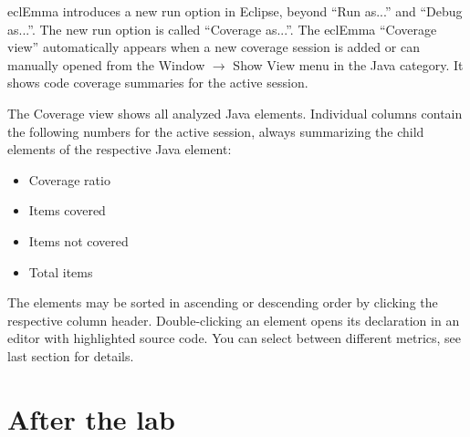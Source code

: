 \documentclass{scrreprt}
\begin{document}
eclEmma introduces a new run option in Eclipse, beyond ``Run as...'' and ``Debug as...''. The new run option is called ``Coverage as...''. The eclEmma ``Coverage view'' automatically appears when a new coverage session is added or can manually opened from the Window $\rightarrow$ Show View menu in the Java category. It shows code coverage summaries for the active session. 

The Coverage view shows all analyzed Java elements. Individual columns contain the following numbers for the active session, always summarizing the child elements of the respective Java element:

\begin{itemize}
\item Coverage ratio
\item Items covered
\item Items not covered
\item Total items
\end{itemize}

The elements may be sorted in ascending or descending order by clicking the respective column header. Double-clicking an element opens its declaration in an editor with highlighted source code. You can select between different metrics, see last section for details. 

\chapter{After the lab}
\end{document}
